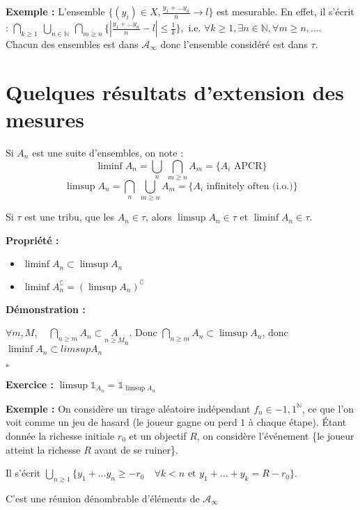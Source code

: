 \documentclass[10pt,a4paper,notitlepage ]{report}
\newcommand{\1}{\mathds 1}
\newcommand{\comp}[1]{#1^\complement}
\newcounter{th}
\newenvironment{propriete}[1][]{
	\begin{tcolorbox}
		\textbf{Propriété #1 : }
}
{\end{tcolorbox}}
\newenvironment{demo}[1][]{

	\textbf{Démonstration #1 :}
}{\begin{flushright}
	$\square$
\end{flushright}
}
\newenvironment{exo}{
	
	\textbf{Exercice :} }{}
\newenvironment{exemple}{
	
	\textbf{Exemple :} }{}
\begin{document}
\begin{exemple}
	L'ensemble $\{(y_i)\in X, \frac{y_1 + \dots y_n}{n} \rightarrow l\}$ est mesurable. En effet, il s'écrit : $\underset{k\ge 1}{\bigcap}\ \underset{n\in \mathbb N}{\bigcup}\ \underset{m \ge n}{\bigcap} \{\left| \frac{y_1+ \dots y_n}{n} - l \right| \le \frac{1}{k}\}, \text{ i.e. } \forall k \ge 1, \exists n\in \mathbb N, \forall m\ge n, \dots$. 
	Chacun des ensembles est dans $\mathcal A_\infty$ donc l'ensemble considéré est dans $\tau$.
\end{exemple}

\section{Quelques résultats d'extension des mesures}
	Si $A_n$ est une suite d'ensembles, on note :
	\[ \liminf A_n = \underset{n}{\bigcup}\ \underset{m\ge n}{\bigcap} A_m = \{A_i \text{ APCR}\}\]
	\[ \limsup A_n = \underset{n}{\bigcap}\ \underset{m\ge n}{\bigcup} A_m = \{A_i \text{ infinitely often (i.o.)}\}\]
	
	Si $\tau$ est une tribu, que les $A_n \in \tau$, alors $\limsup A_n \in \tau$ et $\liminf A_n \in \tau$.
	
	\begin{propriete}
		\begin{itemize}
			\item $\liminf A_n \subset \limsup A_n$
			\item $\liminf \comp{A_n}= \comp{(\limsup A_n)}$
		\end{itemize}
	\end{propriete}
	\begin{demo}
		$\forall m,M, \quad \underset{n\ge m}{\bigcap} A_n \subset \underset{n \ge M} A_n$.
		Donc $\underset{n\ge m}{\bigcap} A_n \subset \limsup A_n$, donc $\liminf A_n \subset limsup A_n$
	\end{demo}
\begin{exo}
	$\limsup \mathds 1_{A_n} = \mathds 1_{\limsup A_n}$
\end{exo}

\begin{exemple}
	On considère un tirage aléatoire indépendant $f_n \in {-1, 1}^{\mathbb N}$, ce que l'on voit comme un jeu de hasard (le joueur gagne ou perd $1$ à chaque étape). Étant donnée la richesse initiale $r_0$ et un objectif $R$, on considère l'événement \{le joueur atteint la richesse $R$ avant de se ruiner\}.
	
	Il s'écrit $\underset{n \ge 1}{\bigcup} \{y_1 + \dots y_n \ge -r_0 \quad \forall k < n \text{ et } y_1 + \dots + y_k = R-r_0\}$.
	
	C'est une réunion dénombrable d'éléments de $\mathcal A_\infty$
\end{exemple}
\end{document}
